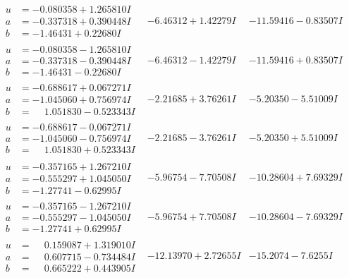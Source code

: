 \documentclass[1p]{elsarticle_modified}
\theoremstyle{definition}
\begin{document}
$$\begin{array}{c|c|c}
\begin{aligned}
u &= -0.080358 + 1.265810 I \\
a &= -0.337318 + 0.390448 I \\
b &= -1.46431 + 0.22680 I\end{aligned}
 & -6.46312 + 1.42279 I & -11.59416 - 0.83507 I \\ \hline\begin{aligned}
u &= -0.080358 - 1.265810 I \\
a &= -0.337318 - 0.390448 I \\
b &= -1.46431 - 0.22680 I\end{aligned}
 & -6.46312 - 1.42279 I & -11.59416 + 0.83507 I \\ \hline\begin{aligned}
u &= -0.688617 + 0.067271 I \\
a &= -1.045060 + 0.756974 I \\
b &= \phantom{-}1.051830 - 0.523343 I\end{aligned}
 & -2.21685 + 3.76261 I & -5.20350 - 5.51009 I \\ \hline\begin{aligned}
u &= -0.688617 - 0.067271 I \\
a &= -1.045060 - 0.756974 I \\
b &= \phantom{-}1.051830 + 0.523343 I\end{aligned}
 & -2.21685 - 3.76261 I & -5.20350 + 5.51009 I \\ \hline\begin{aligned}
u &= -0.357165 + 1.267210 I \\
a &= -0.555297 + 1.045050 I \\
b &= -1.27741 - 0.62995 I\end{aligned}
 & -5.96754 - 7.70508 I & -10.28604 + 7.69329 I \\ \hline\begin{aligned}
u &= -0.357165 - 1.267210 I \\
a &= -0.555297 - 1.045050 I \\
b &= -1.27741 + 0.62995 I\end{aligned}
 & -5.96754 + 7.70508 I & -10.28604 - 7.69329 I \\ \hline\begin{aligned}
u &= \phantom{-}0.159087 + 1.319010 I \\
a &= \phantom{-}0.607715 - 0.734484 I \\
b &= \phantom{-}0.665222 + 0.443905 I\end{aligned}
 & -12.13970 + 2.72655 I & -15.2074 - 7.6255 I \\ \hline\begin{aligned}

\end{aligned}
\end{array}$$
\end{document}
